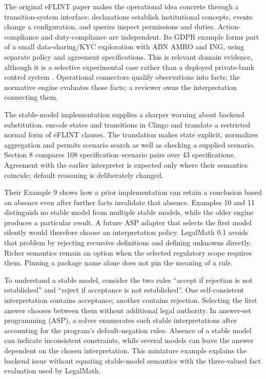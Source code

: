 
The original eFLINT paper makes the operational idea concrete through a
transition-system interface: declarations establish institutional concepts,
events change a configuration, and queries inspect permissions and duties.
Action-compliance and duty-compliance are independent. Its GDPR example forms
part of a small data-sharing/KYC exploration with ABN AMRO and ING, using separate
policy and agreement specifications. This is relevant domain evidence, although
it is a selective experimental case rather than a deployed private-bank control
system \citep[secs.~3--5]{eflint2020}. Operational connectors qualify observations
into facts; the normative engine evaluates those facts; a reviewer owns the
interpretation connecting them.

The stable-model implementation supplies a sharper warning about backend
substitution. \citet[secs.~4--7]{eflintstable2025} encode states and transitions
in Clingo and translate a restricted normal form of eFLINT clauses. The
translation makes state explicit, normalizes aggregation and permits scenario
search as well as checking a supplied scenario. Section 8 compares 108
specification--scenario pairs over 43 specifications. Agreement with the earlier
interpreter is expected only where their semantics coincide; default reasoning
is deliberately changed.

Their Example 9 shows how a prior implementation can retain a conclusion based
on absence even after further facts invalidate that absence. Examples 10 and 11
distinguish no stable model from multiple stable models, while the older engine
produces a particular result. A future ASP adapter that selects the first model
silently would therefore choose an interpretation policy. LegalMath 0.1 avoids
that problem by rejecting recursive definitions and defining unknowns directly.
Richer semantics remain an option when the selected regulatory scope requires
them. Pinning a package name alone does not pin the meaning of a rule.

To understand a stable model, consider the two rules ``accept if rejection is
not established'' and ``reject if acceptance is not established''. One
self-consistent interpretation contains acceptance; another contains rejection.
Selecting the first answer chooses between them without additional legal
authority. In answer-set programming (ASP), a solver enumerates such stable
interpretations after accounting for the program's default-negation rules.
Absence of a stable model can indicate inconsistent constraints, while several models can leave
the answer dependent on the chosen interpretation. This miniature example
explains the backend issue without equating stable-model semantics with the
three-valued fact evaluation used by LegalMath.


